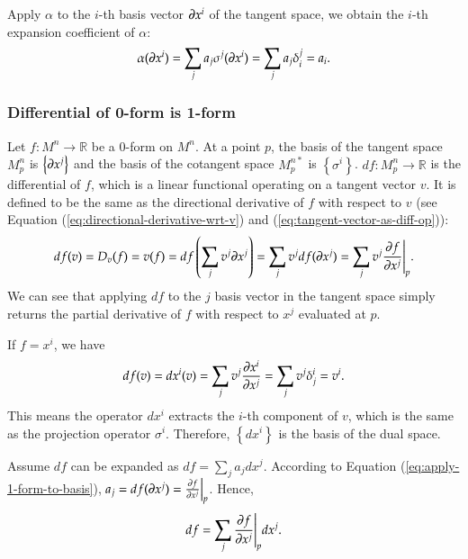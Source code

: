 \documentclass[11pt, a4paper]{book}
\begin{document}
Apply $\alpha$ to the $i$-th basis vector $\boldsymbol{\partial}x^i$ of the tangent space, we
obtain the $i$-th expansion coefficient of $\alpha$:
\begin{equation}
  \label{eq:apply-1-form-to-basis}
  \alpha(\boldsymbol{\partial}x^i) = \sum_j a_j \sigma^j(\boldsymbol{\partial}x^i) = \sum_j a_j
  \delta^j_i = a_i.
\end{equation}

\subsubsection{Differential of 0-form is 1-form}

Let $f: M^n \rightarrow \mathbb{R}$ be a 0-form on $M^n$. At a point $p$, the basis of the
tangent space $M_p^n$ is $\left\{ \boldsymbol{\partial}x^j \right\}$ and the basis of the
cotangent space $M_p^{n*}$ is $\left\{ \sigma^i \right\}$.
$df: M_p^n \rightarrow \mathbb{R}$ is the differential of $f$, which is a linear
functional operating on a tangent vector $v$. It is defined to be the same as the
directional derivative of $f$ with respect to $v$ (see Equation
(\ref{eq:directional-derivative-wrt-v}) and (\ref{eq:tangent-vector-as-diff-op})):
\begin{equation}
  \label{eq:df-and-directional-derivative}
  df(v) = D_v(f) = v(f) = df \left( \sum_j v^j \boldsymbol{\partial}x^j \right) = \sum_j v^j
  df(\boldsymbol{\partial}x^j) = \sum_j v^j \frac{\partial f}{\partial x^j}\Bigg\vert_p.
\end{equation}
We can see that applying $df$ to the $j$ basis vector in the tangent space simply returns
the partial derivative of $f$ with respect to $x^j$ evaluated at $p$.

If $f=x^i$, we have
\begin{equation*}
  df(v) = dx^i(v) = \sum_j v^j \frac{\partial x^{i}}{\partial x^j} = \sum_j v^j \delta^i_j = v^i.
\end{equation*}
This means the operator $dx^i$ extracts the $i$-th component of $v$, which is the same as
the projection operator $\sigma^i$. Therefore, $\left\{ dx^i \right\}$ is the basis of the
dual space.

Assume $df$ can be expanded as $df = \sum_j a_j dx^j$. According to Equation
(\ref{eq:apply-1-form-to-basis}),
$a_j = df(\boldsymbol{\partial}x^j) = \frac{\partial f}{\partial x^j} \Big\vert_p$. Hence,
\begin{equation}
  \label{eq:differential-of-0-form}
  df = \sum_j \frac{\partial f}{\partial x^j}\Bigg\vert_p dx^j.
\end{equation}
\end{document}
